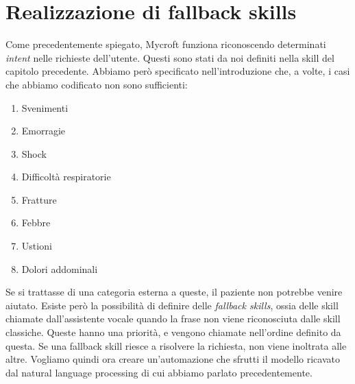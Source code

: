 \section{Realizzazione di fallback skills}
Come precedentemente spiegato, Mycroft funziona riconoscendo determinati \textit{intent} nelle richieste dell'utente. Questi sono stati da noi definiti nella skill del capitolo precedente. Abbiamo però specificato nell'introduzione che, a volte, i casi che abbiamo codificato non sono sufficienti:
\begin{enumerate}
    \item Svenimenti
    \item Emorragie
    \item Shock
    \item Difficoltà respiratorie
    \item Fratture
    \item Febbre
    \item Ustioni
    \item Dolori addominali
\end{enumerate}
Se si trattasse di una categoria esterna a queste, il paziente non potrebbe venire aiutato. Esiste però la possibilità di definire delle \textit{fallback skills}, ossia delle skill chiamate dall'assistente vocale quando la frase non viene riconosciuta dalle skill classiche. Queste hanno una priorità, e vengono chiamate nell'ordine definito da questa. Se una fallback skill riesce a risolvere la richiesta, non viene inoltrata alle altre. Vogliamo quindi ora creare un'automazione che sfrutti il modello ricavato dal natural language processing di cui abbiamo parlato precedentemente.
